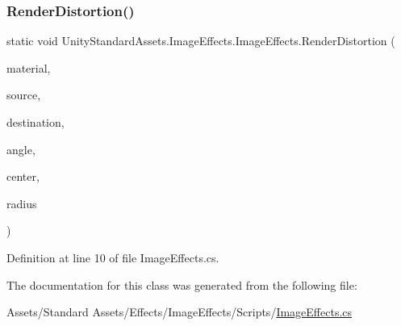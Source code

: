 \subsubsection{\texorpdfstring{Render\+Distortion()}{RenderDistortion()}}
{\footnotesize\ttfamily static void Unity\+Standard\+Assets.\+Image\+Effects.\+Image\+Effects.\+Render\+Distortion (\begin{DoxyParamCaption}\item[{Material}]{material,  }\item[{Render\+Texture}]{source,  }\item[{Render\+Texture}]{destination,  }\item[{float}]{angle,  }\item[{Vector2}]{center,  }\item[{Vector2}]{radius }\end{DoxyParamCaption})\hspace{0.3cm}{\ttfamily [static]}}



Definition at line 10 of file Image\+Effects.\+cs.



The documentation for this class was generated from the following file\+:\begin{DoxyCompactItemize}
\item 
Assets/\+Standard Assets/\+Effects/\+Image\+Effects/\+Scripts/\mbox{\hyperlink{_image_effects_8cs}{Image\+Effects.\+cs}}\end{DoxyCompactItemize}

